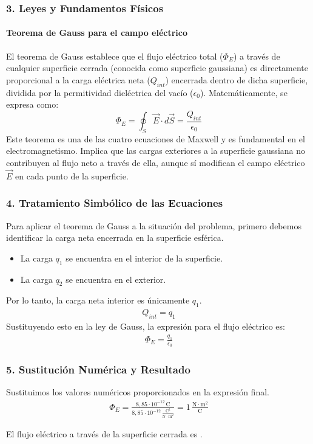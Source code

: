 \subsubsection*{3. Leyes y Fundamentos Físicos}
\paragraph*{Teorema de Gauss para el campo eléctrico}
El teorema de Gauss establece que el flujo eléctrico total ($\Phi_E$) a través de cualquier superficie cerrada (conocida como superficie gaussiana) es directamente proporcional a la carga eléctrica neta ($Q_{int}$) encerrada dentro de dicha superficie, dividida por la permitividad dieléctrica del vacío ($\epsilon_0$).
Matemáticamente, se expresa como:
$$ \Phi_E = \oint_S \vec{E} \cdot d\vec{S} = \frac{Q_{int}}{\epsilon_0} $$
Este teorema es una de las cuatro ecuaciones de Maxwell y es fundamental en el electromagnetismo. Implica que las cargas exteriores a la superficie gaussiana no contribuyen al flujo neto a través de ella, aunque sí modifican el campo eléctrico $\vec{E}$ en cada punto de la superficie.

\subsubsection*{4. Tratamiento Simbólico de las Ecuaciones}
Para aplicar el teorema de Gauss a la situación del problema, primero debemos identificar la carga neta encerrada en la superficie esférica.
\begin{itemize}
    \item La carga $q_1$ se encuentra en el interior de la superficie.
    \item La carga $q_2$ se encuentra en el exterior.
\end{itemize}
Por lo tanto, la carga neta interior es únicamente $q_1$.
\begin{gather}
    Q_{int} = q_1
\end{gather}
Sustituyendo esto en la ley de Gauss, la expresión para el flujo eléctrico es:
\begin{gather}
    \Phi_E = \frac{q_1}{\epsilon_0}
\end{gather}

\subsubsection*{5. Sustitución Numérica y Resultado}
Sustituimos los valores numéricos proporcionados en la expresión final.
\begin{gather}
    \Phi_E = \frac{8,85 \cdot 10^{-12} \, \text{C}}{8,85 \cdot 10^{-12} \, \frac{\text{C}^2}{\text{N}\cdot\text{m}^2}} = 1 \, \frac{\text{N}\cdot\text{m}^2}{\text{C}}
\end{gather}
\begin{cajaresultado}
    El flujo eléctrico a través de la superficie cerrada es .
\end{cajaresultado}


